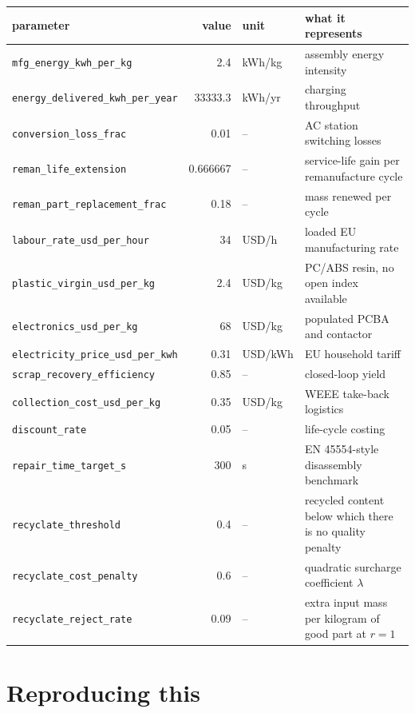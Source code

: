 \documentclass[11pt,a4paper]{article}
\begin{document}
\begin{table}[h]
\centering\small
\begin{tabular}{lrlp{6.4cm}}
\toprule
parameter & value & unit & what it represents \\
\midrule
\texttt{mfg\_energy\_kwh\_per\_kg} & 2.4 & kWh/kg & assembly energy intensity \\
\texttt{energy\_delivered\_kwh\_per\_year} & 33333.3 & kWh/yr & charging throughput \\
\texttt{conversion\_loss\_frac} & 0.01 & -- & AC station switching losses \\
\texttt{reman\_life\_extension} & 0.666667 & -- & service-life gain per remanufacture cycle \\
\texttt{reman\_part\_replacement\_frac} & 0.18 & -- & mass renewed per cycle \\
\texttt{labour\_rate\_usd\_per\_hour} & 34 & USD/h & loaded EU manufacturing rate \\
\texttt{plastic\_virgin\_usd\_per\_kg} & 2.4 & USD/kg & PC/ABS resin, no open index available \\
\texttt{electronics\_usd\_per\_kg} & 68 & USD/kg & populated PCBA and contactor \\
\texttt{electricity\_price\_usd\_per\_kwh} & 0.31 & USD/kWh & EU household tariff \\
\texttt{scrap\_recovery\_efficiency} & 0.85 & -- & closed-loop yield \\
\texttt{collection\_cost\_usd\_per\_kg} & 0.35 & USD/kg & WEEE take-back logistics \\
\texttt{discount\_rate} & 0.05 & -- & life-cycle costing \\
\texttt{repair\_time\_target\_s} & 300 & s & EN 45554-style disassembly benchmark \\
\texttt{recyclate\_threshold} & 0.4 & -- & recycled content below which there is no quality penalty \\
\texttt{recyclate\_cost\_penalty} & 0.6 & -- & quadratic surcharge coefficient $\lambda$ \\
\texttt{recyclate\_reject\_rate} & 0.09 & -- & extra input mass per kilogram of good part at $r=1$ \\
\bottomrule
\end{tabular}
\end{table}

\FloatBarrier
\section{Reproducing this}
\end{document}
